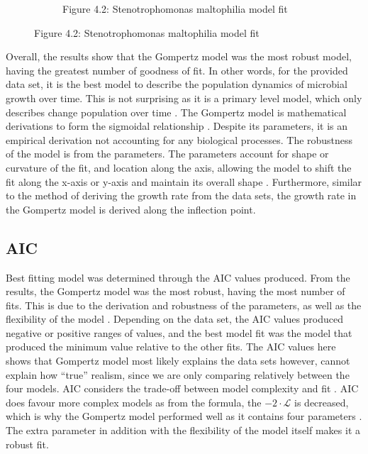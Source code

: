 \documentclass[11pt]{article}
\begin{document}
\begin{figure}[h!]
\begin{subfigure}[h]{0.4\textwidth}
        \caption{Figure 4.2: Stenotrophomonas maltophilia model fit}
        \label{fig:Stenotrophomonas maltophilia}
    \end{subfigure}
\end{figure}

Overall, the results show that the Gompertz model was the most robust model, having the greatest number of goodness of fit. In other words, for the provided data set, it is the best model to describe the population dynamics of microbial growth over time. This is not surprising as it is a primary level model, which only describes change population over time \cite{grijspeerdt1999estimating}. The Gompertz model is mathematical derivations to form the sigmoidal relationship \cite{buchanan1997simple}. Despite its parameters, it is an empirical derivation not accounting for any biological processes. The robustness of the model is from the parameters. The parameters account for shape or curvature of the fit, and location along the axis, allowing the model to shift the fit along the x-axis or y-axis and maintain its overall shape \cite{tjorve2017use}. Furthermore, similar to the method of deriving the growth rate from the data sets, the growth rate in the Gompertz model is derived along the inflection point.

\subsection{AIC}

Best fitting model was determined through the AIC values produced. From the results, the Gompertz model was the most robust, having the most number of fits. This is due to the derivation and robustness of the parameters, as well as the flexibility of the model \cite{tjorve2017use}. Depending on the data set, the AIC values produced negative or positive ranges of values, and the best model fit was the model that produced the minimum value relative to the other fits. The AIC values here shows that Gompertz model most likely explains the data sets however, cannot explain how “true” realism, since we are only comparing relatively between the four models. AIC considers the trade-off between model complexity and fit \cite{vrieze2012model}. AIC does favour more complex models as from the formula, the $-2 \cdot \mathcal{L}$ is decreased, which is why the Gompertz model performed well as it contains four parameters \cite{posada2004model}. The extra parameter in addition with the flexibility of the model itself makes it a robust fit.
\end{document}
